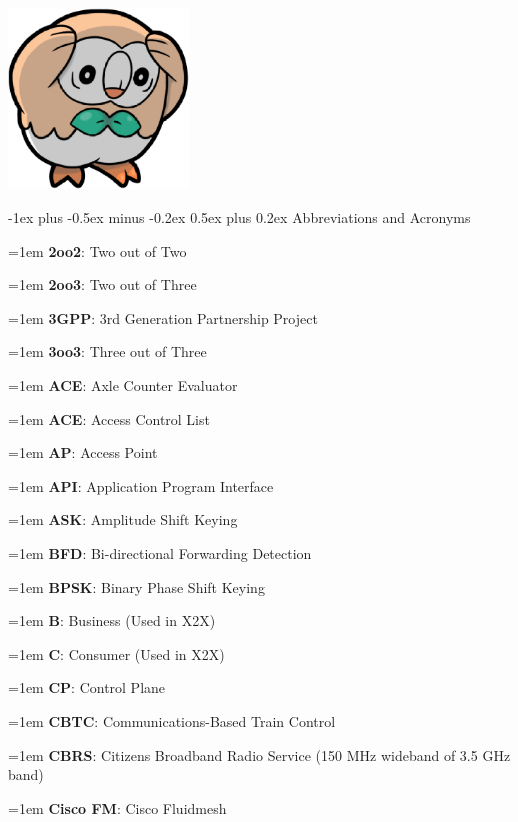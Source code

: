 \documentclass[letterpaper,8pt]{extarticle}
\makeatletter
\newcommand{\definition}[2]{
  \hangindent=1em
  \textbf{#1}: #2%
}
\renewcommand{\section}{\@startsection{section}{1}{0mm}%
  {-1ex plus -0.5ex minus -0.2ex}%
  {0.5ex plus 0.2ex}%
{\color{h1} \normalfont\small\bfseries}}
\makeatother
\begin{document}
\begin{multicols*}{5}
  
  \begin{center}
    \includegraphics[width=4.8cm]{ROWLET.png}
  \end{center}
  
  \section{Abbreviations and Acronyms}
  
  \begin{multicols*}{2}
    \definition{2oo2}{Two out of Two}
    
    \definition{2oo3}{Two out of Three}
    
    \definition{3GPP}{3rd Generation Partnership Project}
    
    \definition{3oo3}{Three out of Three}
    
    \definition{ACE}{Axle Counter Evaluator}
    
    \definition{ACE}{Access Control List}
    
    \definition{AP}{Access Point}
    
    \definition{API}{Application Program Interface}
    
    \definition{ASK}{Amplitude Shift Keying}
    
    \definition{BFD}{Bi-directional Forwarding Detection}
    
    \definition{BPSK}{Binary Phase Shift Keying}
    
    \definition{B}{Business (Used in X2X)}
    
    \definition{C}{Consumer (Used in X2X)}
    
    \definition{CP}{Control Plane}
    
    \definition{CBTC}{Communications-Based Train Control}
    
    \definition{CBRS}{Citizens Broadband Radio Service (150 MHz wideband of 3.5 GHz band)}
    
    \definition{Cisco FM}{Cisco Fluidmesh}
    

\end{multicols*}
\end{multicols*}
\end{document}
